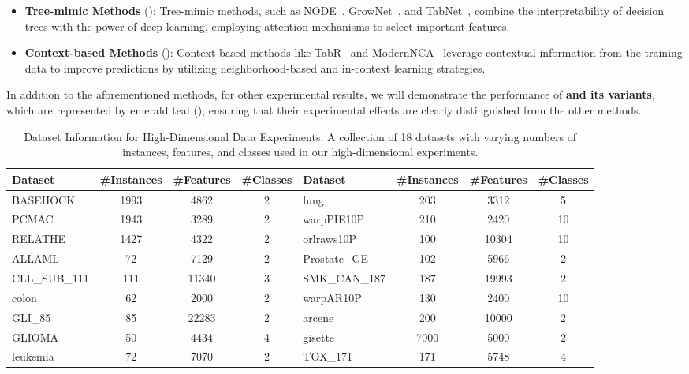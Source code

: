 \begin{itemize}
    \item \textbf{Tree-mimic Methods} (): Tree-mimic methods, such as NODE~\citep{PopovMB20Neural}, GrowNet~\citep{Badirli2020GrowNet}, and TabNet~\citep{ArikP21TabNet}, combine the interpretability of decision trees with the power of deep learning, employing attention mechanisms to select important features.
    
    \item \textbf{Context-based Methods} (): Context-based methods like TabR~\citep{gorishniy2023tabr} and ModernNCA~\citep{Ye2024ModernNCA} leverage contextual information from the training data to improve predictions by utilizing neighborhood-based and in-context learning strategies.
\end{itemize}
In addition to the aforementioned methods, for other experimental results, we will demonstrate the performance of \textbf{\ours and its variants}, which are represented by emerald teal (), ensuring that their experimental effects are clearly distinguished from the other methods.

\begin{table}[ht]
\centering
\caption{Dataset Information for High-Dimensional Data Experiments: A collection of 18 datasets with varying numbers of instances, features, and classes used in our high-dimensional experiments.}
\begin{tabular}{lccc|lccc}
\toprule
\textbf{Dataset} & \textbf{\#Instances} & \textbf{\#Features} & \textbf{\#Classes} &\textbf{Dataset} & \textbf{\#Instances} & \textbf{\#Features} & \textbf{\#Classes} \\
\midrule
BASEHOCK&	1993&	4862&	2  &lung&	203&	3312&	5  \\
PCMAC	&1943	&3289	&2  & warpPIE10P&	210&	2420&	10\\
RELATHE	&1427	&4322	&2  &orlraws10P &	100&	10304&	10 \\
ALLAML	& 72	&7129	&2  & Prostate\_GE	&102&	5966&	2 \\
CLL\_SUB\_111&	111&	11340&	3 & SMK\_CAN\_187&	187&	19993&	2 \\
colon&	62&	2000&	2  & warpAR10P	&130	&2400	&10 \\
GLI\_85&	85	&22283	&2  & arcene&	200&	10000&	2\\
GLIOMA&	50	&4434&	4  & gisette	&7000&	5000&	2 \\
leukemia&	72&	7070&	2  & TOX\_171&	171&	5748&	4 \\
\bottomrule
\end{tabular}
\label{tab:high_dataset_info}
\end{table}

